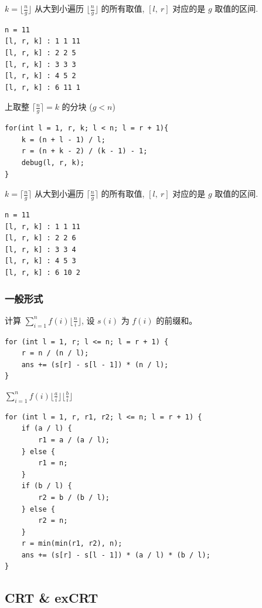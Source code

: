 \documentclass[UTF8, a4paper, titlepage, twoside]{ctexart}
\begin{document}
$k = \lfloor \frac{n}{g} \rfloor$ 从大到小遍历 $\lfloor \frac{n}{g} \rfloor$ 的所有取值, $[l, \ r]$ 对应的是 $g$ 取值的区间.

\begin{lstlisting}[style=cpp]
n = 11
[l, r, k] : 1 1 11 
[l, r, k] : 2 2 5 
[l, r, k] : 3 3 3 
[l, r, k] : 4 5 2 
[l, r, k] : 6 11 1 
\end{lstlisting}

上取整 $\lceil \frac{n}{g} \rceil = k$ 的分块 ($g < n$)

\begin{lstlisting}[style=cpp]
for(int l = 1, r, k; l < n; l = r + 1){
    k = (n + l - 1) / l;
    r = (n + k - 2) / (k - 1) - 1;
    debug(l, r, k);
}
\end{lstlisting}

$k = \lceil \frac{n}{g} \rceil$ 从大到小遍历 $\lceil \frac{n}{g} \rceil$ 的所有取值, $[l, \ r]$ 对应的是 $g$ 取值的区间.

\begin{lstlisting}[style=cpp]
n = 11
[l, r, k] : 1 1 11 
[l, r, k] : 2 2 6 
[l, r, k] : 3 3 4 
[l, r, k] : 4 5 3 
[l, r, k] : 6 10 2 
\end{lstlisting}

\subsubsection*{ 一般形式 }

计算 $\sum_{i=1}^n f(i)\lfloor \frac{n}{i} \rfloor$, 设 $s(i)$ 为 $f(i)$ 的前缀和。

\begin{lstlisting}[style=cpp]
for (int l = 1, r; l <= n; l = r + 1) {
    r = n / (n / l);
    ans += (s[r] - s[l - 1]) * (n / l);
}
\end{lstlisting}

$\sum_{i = 1}^{n}f(i){\lfloor{\frac{a}{i}}\rfloor\lfloor{\frac{b}{i}}\rfloor}$

\begin{lstlisting}[style=cpp]
for (int l = 1, r, r1, r2; l <= n; l = r + 1) {
    if (a / l) {
        r1 = a / (a / l);
    } else {
        r1 = n;
    }
    if (b / l) {
        r2 = b / (b / l);
    } else {
        r2 = n;
    }
    r = min(min(r1, r2), n);
    ans += (s[r] - s[l - 1]) * (a / l) * (b / l);
}
\end{lstlisting}

\subsection{ CRT \& exCRT }
\end{document}

